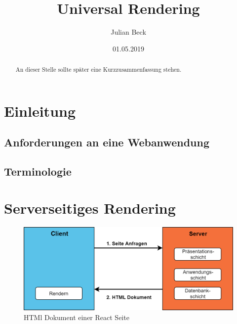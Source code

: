 \documentclass[runningheads]{llncs}
\title{Universal Rendering}
\author{Julian Beck}
\institute{Betreuer: Prof. Dr. rer. nat. Christian Zirpins}
\date{01.05.2019}
\begin{document}
\let\oldaddcontentsline\addcontentsline
\def\addcontentsline#1#2#3{}
\maketitle
\def\addcontentsline#1#2#3{\oldaddcontentsline{#1}{#2}{#3}}


\begin{abstract}
  An dieser Stelle sollte später eine Kurzzusammenfassung stehen.
\end{abstract}

\tableofcontents 
\newpage

\section{Einleitung}
\label{sec:Einleitung}


\subsection{Anforderungen an eine Webanwendung}
\label{subsec:Anforderungen an eine Webanwendung}

\subsection{Terminologie}
\label{subsec:Terminologie}


\section{Serverseitiges Rendering}
\label{sec:Serverseitiges Rendering}

\begin{figure}[h]
  \centering
  \includegraphics[width=12cm]{images/server}
  \caption{HTMl Dokument einer React Seite}
\end{figure}
\end{document}
